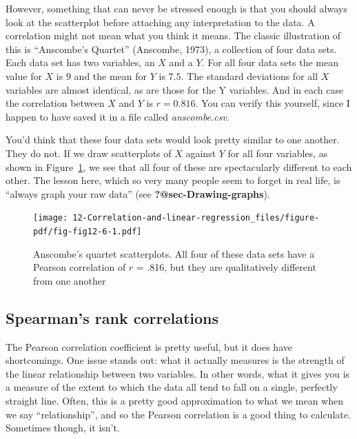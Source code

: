 \documentclass[
  a4paper,
]{book}
\begin{document}
However, something that can never be stressed enough is that you should
always look at the scatterplot before attaching any interpretation to
the data. A correlation might not mean what you think it means. The
classic illustration of this is ``Anscombe's Quartet'' (Anscombe, 1973),
a collection of four data sets. Each data set has two variables, an
\(X\) and a \(Y\). For all four data sets the mean value for \(X\) is
\(9\) and the mean for \(Y\) is \(7.5\). The standard deviations for all
\(X\) variables are almost identical, as are those for the Y variables.
And in each case the correlation between \(X\) and \(Y\) is
\(r = 0.816\). You can verify this yourself, since I happen to have
saved it in a file called \emph{anscombe.csv}.

You'd think that these four data sets would look pretty similar to one
another. They do not. If we draw scatterplots of \(X\) against \(Y\) for
all four variables, as shown in Figure~\ref{fig-fig12-6}, we see that
all four of these are spectacularly different to each other. The lesson
here, which so very many people seem to forget in real life, is ``always
graph your raw data'' (see \textbf{?@sec-Drawing-graphs}).

\begin{figure}[h!]

\texttt{[image: 12-Correlation-and-linear-regression\_files/figure-pdf/fig-fig12-6-1.pdf]} \hfill{}

\caption{\label{fig-fig12-6}Anscombe's quartet scatterplots. All four of
these data sets have a Pearson correlation of \(r\) = .816, but they are
qualitatively different from one another}

\end{figure}

\hypertarget{spearmans-rank-correlations}{%
\subsection{Spearman's rank
correlations}\label{spearmans-rank-correlations}}

The Pearson correlation coefficient is pretty useful, but it does have
shortcomings. One issue stands out: what it actually measures is the
strength of the linear relationship between two variables. In other
words, what it gives you is a measure of the extent to which the data
all tend to fall on a single, perfectly straight line. Often, this is a
pretty good approximation to what we mean when we say ``relationship'',
and so the Pearson correlation is a good thing to calculate. Sometimes
though, it isn't.
\end{document}
